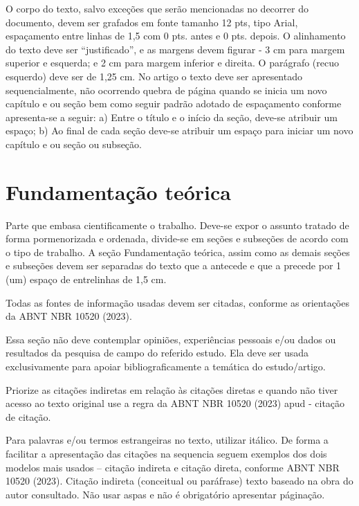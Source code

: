 \documentclass[
article,			%
11pt,				%
twoside,			%
a4paper,			%
section=TITLE,		%
onecolumn,          %
english,			%
brazil,				%
sumario=tradicional
]{abntex2}
\begin{document}
O corpo do texto, salvo exceções que serão mencionadas no decorrer do documento, devem ser grafados em fonte tamanho 12 pts, tipo Arial, espaçamento entre linhas de 1,5 com 0 pts. antes e 0 pts. depois. O alinhamento do texto deve ser “justificado”, e as margens devem figurar -  3 cm para margem superior e esquerda; e 2 cm para margem inferior e direita. O parágrafo (recuo esquerdo) deve ser de 1,25 cm. No artigo o texto deve ser apresentado sequencialmente, não ocorrendo quebra de página quando se inicia um novo capítulo e ou seção bem como seguir padrão adotado de espaçamento conforme apresenta-se a seguir: a) Entre o título e o início da seção, deve-se atribuir um espaço; b) Ao final de cada seção deve-se atribuir um espaço para iniciar um novo capítulo e ou seção ou subseção. 

\section{Fundamentação teórica}

Parte que embasa cientificamente o trabalho. Deve-se expor o assunto tratado de forma pormenorizada e ordenada, divide-se em seções e subseções de acordo com o tipo de trabalho. A seção Fundamentação teórica, assim como as demais seções e subseções devem ser separadas do texto que a antecede e que a precede por 1 (um) espaço de entrelinhas de 1,5 cm.

Todas as fontes de informação usadas devem ser citadas, conforme as orientações da ABNT NBR 10520 (2023). 

Essa seção não deve contemplar opiniões, experiências pessoais e/ou dados ou resultados da pesquisa de campo do referido estudo. Ela deve ser usada exclusivamente para apoiar bibliograficamente a temática do estudo/artigo.

Priorize as citações indiretas em relação às citações diretas e quando não tiver acesso ao texto original use a regra da ABNT NBR 10520 (2023) apud - citação de citação.

Para palavras e/ou termos estrangeiras no texto, utilizar itálico. 
De forma a facilitar a apresentação das citações na sequencia seguem exemplos dos dois modelos mais usados – citação indireta e citação direta, conforme ABNT NBR 10520 (2023).
Citação indireta  (conceitual ou paráfrase) texto baseado na obra do autor consultado. Não usar aspas e não é obrigatório apresentar páginação.
\end{document}
